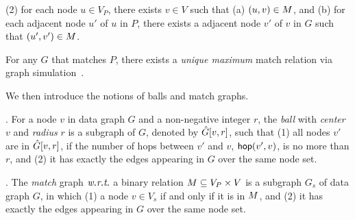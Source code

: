 \vspace{0.5ex}
\ni
(2) for each node  $u\in V_P$, there exists $v\in V$ such that
(a) $(u, v) \in M$, and
(b) for each adjacent node $u'$ of $u$ in $P$, there exists a adjacent node $v'$ of $v$
in $G$ such that $(u',v') \in M$.

For any $G$ that matches $P$, there exists a {\em unique maximum} match relation via graph simulation~\cite{infsimu95}.

We then introduce the notions of balls and match graphs.




. For a node $v$ in data graph $G$ and a non-negative integer $r$,
the {\em ball} with {\em center} $v$ and {\em radius} $r$  is a subgraph of $G$,
denoted by $\hat{G}{[v, r]}$, such that (1) all nodes $v'$ are in $\hat{G}{[v, r]}$, if
the number of hops between $v'$ and $v$, ${\mathsf{hop}}(v', v)$, is no more than $r$, and (2) it has exactly the edges
appearing in $G$ over the same node set.


. The {\em match} graph $\emph{w.r.t.}$ a binary relation $M\subseteq V_P\times V$ is a subgraph $G_s$ of data graph $G$, in which
(1)  a node $v\in V_s$ if and only if it is in $M$, and
(2) it has exactly the edges
appearing in $G$ over the same node set.

